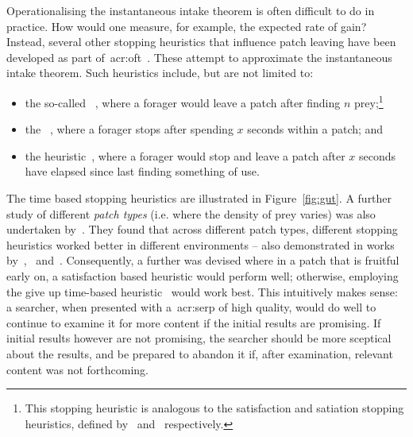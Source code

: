 Operationalising the instantaneous intake theorem is often difficult to do in practice. How would one measure, for example, the expected rate of gain? Instead, several other stopping heuristics that influence patch leaving have been developed as part of~\gls{acr:oft}~\citep{stephens1986foraging_theory}. These attempt to approximate the instantaneous intake theorem. Such heuristics include, but are not limited to:

\begin{itemize}
    \item{the so-called ~\citep{gibb1958number_rule}, where a forager would leave a patch after finding $n$ prey;\footnote{This stopping heuristic is analogous to the satisfaction and satiation stopping heuristics, defined by~\cite{cooper1973retrieval_effectiveness} and~\cite{simon1955satiation} respectively.}}
    
    \item{the ~\citep{charles1972behaviour, krebs1973time_rule}, where a forager stops after spending $x$ seconds within a patch; and}
    
    \item{the  heuristic~\citep{krebs1974leave_after_rule}, where a forager would stop and leave a patch after $x$ seconds have elapsed since last finding something of use.}
\end{itemize}

The time based stopping heuristics are illustrated in Figure~\ref{fig:gut}. A further study of different \emph{patch types} (i.e. where the density of prey varies) was also undertaken by~\cite{mcnair1982gut_mvt}. They found that across different patch types, different stopping heuristics worked better in different environments -- also demonstrated in works by~\cite{iwasa1981prey_distribution},~\cite{mcnair1982gut_mvt} and~\cite{green1984oft_stopping}. Consequently, a further  was devised where in a patch that is fruitful early on, a satisfaction based heuristic would perform well; otherwise, employing the give up time-based heuristic~\citep{krebs1974leave_after_rule} would work best. This intuitively makes sense: a searcher, when presented with a~\gls{acr:serp} of high quality, would do well to continue to examine it for more content if the initial results are promising. If initial results however are not promising, the searcher should be more sceptical about the results, and be prepared to abandon it if, after examination, relevant content was not forthcoming.

